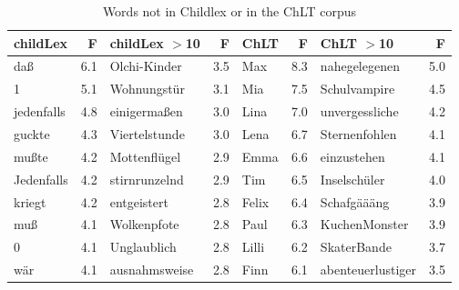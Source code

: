 \documentclass[doc, a4paper, anonymous]{apa7}
\begin{document}
\begin{table}[!htbp]
\caption{Words not in Childlex or in the ChLT corpus}
\centering
\begin{tabular}{lrlrlrlr}
  \hline
childLex & F & childLex $>$10 & F & ChLT & F & ChLT $>$10 & F \\ 
  \hline
daß & 6.1 & Olchi-Kinder & 3.5 & Max & 8.3 & nahegelegenen & 5.0 \\ 
  1 & 5.1 & Wohnungstür & 3.1 & Mia & 7.5 & Schulvampire & 4.5 \\ 
  jedenfalls & 4.8 & einigermaßen & 3.0 & Lina & 7.0 & unvergessliche & 4.2 \\ 
  guckte & 4.3 & Viertelstunde & 3.0 & Lena & 6.7 & Sternenfohlen & 4.1 \\ 
  mußte & 4.2 & Mottenflügel & 2.9 & Emma & 6.6 & einzustehen & 4.1 \\ 
  Jedenfalls & 4.2 & stirnrunzelnd & 2.9 & Tim & 6.5 & Inselschüler & 4.0 \\ 
  kriegt & 4.2 & entgeistert & 2.8 & Felix & 6.4 & Schafgäääng & 3.9 \\ 
  muß & 4.1 & Wolkenpfote & 2.8 & Paul & 6.3 & KuchenMonster & 3.9 \\ 
  0 & 4.1 & Unglaublich & 2.8 & Lilli & 6.2 & SkaterBande & 3.7 \\ 
  wär & 4.1 & ausnahmsweise & 2.8 & Finn & 6.1 & abenteuerlustiger & 3.5 \\ 
   \hline
\end{tabular}
\label{words-chlt}
\end{table}
\end{document}
